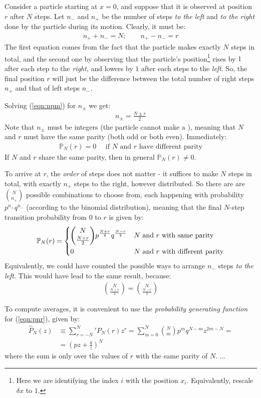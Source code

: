 \documentclass[../template.tex]{subfiles}
\begin{document}
Consider a particle starting at $x=0$, and suppose that it is observed at position $r$ after $N$ steps. Let $n_-$ and $n_+$ be the number of steps \textit{to the left} and \textit{to the right} done by the particle during its motion. Clearly, it must be:
\begin{align}
    n_+ + n_- = N; \qquad n_+ - n_- = r \label{eqn:npm}
\end{align}  
The first equation comes from the fact that the particle makes exactly $N$ steps in total, and the second one by observing that the particle's position\footnote{Here we are identifying the index $i$ with the position $x_i$. Equivalently, rescale $\delta x$ to $1$.} rises by $1$ after each step to the \textit{right}, and lowers by $1$ after each steps to the \textit{left}. So, the final position $r$ will just be the difference between the total number of right steps $n_+$ and that of left steps $n_-$.  

\medskip

Solving (\ref{eqn:npm}) for $n_\pm$ we get:
\begin{align*}
    n_\pm = \frac{N \pm r}{2} 
\end{align*}
Note that $n_\pm$ must be integers (the particle cannot make a ), meaning that $N$ and $r$ must have the same parity (both odd or both even). Immediately:
\begin{align*}
    \mathbb{P}_N(r) = 0 \quad \text{ if $N$ and $r$ have different parity}
\end{align*}
If $N$ and $r$ share the same parity, then in general $\mathbb{P}_N(r) \neq 0$.

To arrive at $r$, the \textit{order} of steps does not matter - it suffices to make $N$ steps in total, with exactly $n_+$ steps to the right, however distributed. So there are are ${N \choose n_+}$ possible combinations to choose from, each happening with probability $p^{n_+} q^{n_-}$ (according to the binomial distribution), meaning that the final $N$-step transition probability from $0$ to $r$ is given by:
\begin{align}
    \mathbb{P}_{N}(r) = \begin{dcases}
        {N \choose \frac{N+r}{2}} p^{\frac{N+r}{2}} q^{\frac{N-r}{2}} & \text{$N$ and $r$ with same parity}\\
        0 & \text{$N$ and $r$ with different parity}
    \end{dcases} \label{eqn:pnr}
\end{align}
Equivalently, we could have counted the possible ways to arrange $n_-$ steps \textit{to the left}. This would have lead to the same result, because:
\begin{align*}
    {N\choose \frac{N+r}{2}} = {N\choose \frac{N-r}{2}}
\end{align*} 

To compute averages, it is convenient to use the \textit{probability generating function} for (\ref{eqn:pnr}), given by:
\begin{align*}
    \hat{P}_N(z) &\equiv {\sum_{r=-N}^N}' P_N(r) z^r = \sum_{m=0}^N {N\choose m} p^m q^{N-m} z^{2m - N} =\\
    &= \left(pz + \frac{q}{z} \right)^N
\end{align*}
where the sum is only over the values of $r$ with the same parity of $N$. 
...
\end{document}
